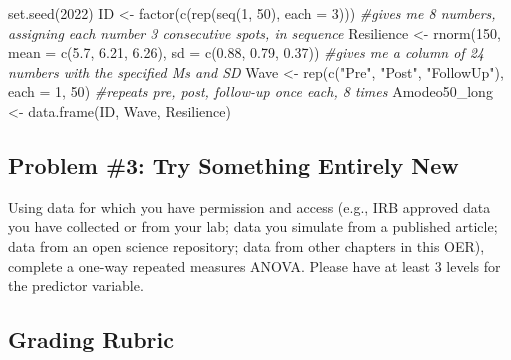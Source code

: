 \documentclass[
  11pt,
]{book}
\newenvironment{Shaded}{\begin{snugshade}}{\end{snugshade}}
\newcommand{\AttributeTok}[1]{\textcolor[rgb]{0.77,0.63,0.00}{#1}}
\newcommand{\CommentTok}[1]{\textcolor[rgb]{0.56,0.35,0.01}{\textit{#1}}}
\newcommand{\DecValTok}[1]{\textcolor[rgb]{0.00,0.00,0.81}{#1}}
\newcommand{\FloatTok}[1]{\textcolor[rgb]{0.00,0.00,0.81}{#1}}
\newcommand{\FunctionTok}[1]{\textcolor[rgb]{0.00,0.00,0.00}{#1}}
\newcommand{\NormalTok}[1]{#1}
\newcommand{\OtherTok}[1]{\textcolor[rgb]{0.56,0.35,0.01}{#1}}
\newcommand{\StringTok}[1]{\textcolor[rgb]{0.31,0.60,0.02}{#1}}
\begin{document}
\begin{Shaded}
\begin{Highlighting}[]
\FunctionTok{set.seed}\NormalTok{(}\DecValTok{2022}\NormalTok{)}
\NormalTok{ID }\OtherTok{\textless{}{-}} \FunctionTok{factor}\NormalTok{(}\FunctionTok{c}\NormalTok{(}\FunctionTok{rep}\NormalTok{(}\FunctionTok{seq}\NormalTok{(}\DecValTok{1}\NormalTok{, }\DecValTok{50}\NormalTok{), }\AttributeTok{each =} \DecValTok{3}\NormalTok{)))  }\CommentTok{\#gives me 8 numbers, assigning each number 3 consecutive spots, in sequence}
\NormalTok{Resilience }\OtherTok{\textless{}{-}} \FunctionTok{rnorm}\NormalTok{(}\DecValTok{150}\NormalTok{, }\AttributeTok{mean =} \FunctionTok{c}\NormalTok{(}\FloatTok{5.7}\NormalTok{, }\FloatTok{6.21}\NormalTok{, }\FloatTok{6.26}\NormalTok{), }\AttributeTok{sd =} \FunctionTok{c}\NormalTok{(}\FloatTok{0.88}\NormalTok{, }\FloatTok{0.79}\NormalTok{,}
    \FloatTok{0.37}\NormalTok{))  }\CommentTok{\#gives me a column of 24 numbers with the specified Ms and SD}
\NormalTok{Wave }\OtherTok{\textless{}{-}} \FunctionTok{rep}\NormalTok{(}\FunctionTok{c}\NormalTok{(}\StringTok{"Pre"}\NormalTok{, }\StringTok{"Post"}\NormalTok{, }\StringTok{"FollowUp"}\NormalTok{), }\AttributeTok{each =} \DecValTok{1}\NormalTok{, }\DecValTok{50}\NormalTok{)  }\CommentTok{\#repeats pre, post, follow{-}up once each, 8 times}
\NormalTok{Amodeo50\_long }\OtherTok{\textless{}{-}} \FunctionTok{data.frame}\NormalTok{(ID, Wave, Resilience)}
\end{Highlighting}
\end{Shaded}

\hypertarget{problem-3-try-something-entirely-new}{%
\subsection{Problem \#3: Try Something Entirely New}\label{problem-3-try-something-entirely-new}}

Using data for which you have permission and access (e.g., IRB approved data you have collected or from your lab; data you simulate from a published article; data from an open science repository; data from other chapters in this OER), complete a one-way repeated measures ANOVA. Please have at least 3 levels for the predictor variable.

\hypertarget{grading-rubric-3}{%
\subsection{Grading Rubric}\label{grading-rubric-3}}
\end{document}
